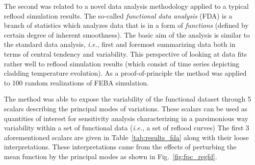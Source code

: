 \documentclass[11pt,titlepage]{article}
\begin{document}
The second was related to a novel data analysis methodology applied to a 
typical reflood simulation results.
The so-called \textit{functional data analysis} (FDA) is a branch of statistics 
which analyzes data that is in a form of \textit{functions} 
(defined by certain degree of inherent smoothness). 
The basic aim of the analysis is similar to the standard data analysis, 
\textit{i.e.,} first and foremost summarizing data both in terms of 
central tendency and variability. 
This perspective of looking at data fits rather well to reflood simulation 
results (which consist of time series depicting cladding temperature evolution).
As a proof-of-principle the method was applied to 100 random realizations
of FEBA simulation.

The method was able to expose the variability of the functional dataset 
through 5 scalars describing the principal modes of variations.
These scalars can be used as quantities of interest for sensitivity 
analysis characterizing in a parsimonious way variability within a 
set of functional data (\textit{i.e.,} a set of reflood curves)
The first 3 aforementioned scalars are given in Table~\ref{tab:results_fda} 
along with their loose interpretations. 
These interpretations came from the effects of perturbing the mean function 
by the principal modes as shown in Fig.~\ref{fig:fpc_regfd}.
    
\end{document}
